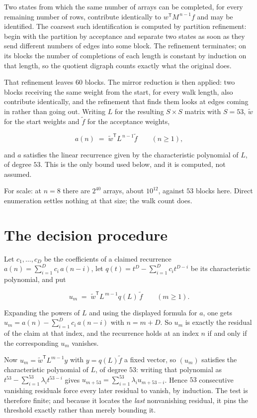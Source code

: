 \documentclass[11pt]{article}
\theoremstyle{definition}
\begin{document}
Two states from which the same number of arrays can be completed, for every remaining number of rows, contribute identically to $w^{\mathsf T}M^{\,n-1}f$ and may be identified. The coarsest such identification is computed by partition refinement: begin with the partition by acceptance and separate two states as soon as they send different numbers of edges into some block. The refinement terminates; on its blocks the number of completions of each length is constant by induction on that length, so the quotient digraph counts exactly what the original does.

That refinement leaves $60$ blocks. The mirror reduction is then applied: two blocks receiving the same weight from the start, for every walk length, also contribute identically, and the refinement that finds them looks at edges coming in rather than going out. Writing $L$ for the resulting $S \times S$ matrix with $S = 53$, $\tilde w$ for the start weights and $\tilde f$ for the acceptance weights,

\[a(n) \;=\; \tilde w^{\mathsf T} L^{\,n-1} \tilde f \qquad (n \ge 1),\]

and $a$ satisfies the linear recurrence given by the characteristic polynomial of $L$, of degree $53$. This is the only bound used below, and it is computed, not assumed.

For scale: at $n = 8$ there are $2^{40}$ arrays, about $10^{12}$, against $53$ blocks here. Direct enumeration settles nothing at that size; the walk count does.

\section{The decision procedure}

Let $c_1,\dots,c_D$ be the coefficients of a claimed recurrence $a(n) = \sum_{i=1}^{D} c_i\,a(n-i)$, let $q(t) = t^{D} - \sum_{i=1}^{D} c_i t^{D-i}$ be its characteristic polynomial, and put

\[u_m \;=\; \tilde w^{\mathsf T} L^{\,m-1} q(L)\,\tilde f \qquad (m \ge 1).\]

Expanding the powers of $L$ and using the displayed formula for $a$, one gets $u_m = a(n) - \sum_{i=1}^{D} c_i\,a(n-i)$ with $n = m + D$. So $u_m$ is exactly the residual of the claim at that index, and the recurrence holds at an index $n$ if and only if the corresponding $u_m$ vanishes.

Now $u_m = \tilde w^{\mathsf T} L^{m-1} y$ with $y = q(L)\tilde f$ a fixed vector, so $(u_m)$ satisfies the characteristic polynomial of $L$, of degree $53$: writing that polynomial as $t^{53} - \sum_{i=1}^{53} \lambda_i t^{53-i}$ gives $u_{m+53} = \sum_{i=1}^{53} \lambda_i u_{m+53-i}$. Hence $53$ consecutive vanishing residuals force every later residual to vanish, by induction. The test is therefore finite; and because it locates the {\itshape last} nonvanishing residual, it pins the threshold exactly rather than merely bounding it.
\end{document}
